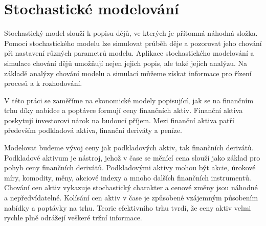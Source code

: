 \documentclass[a4paper,12pt]{report}
\theoremstyle{definition} \newtheorem{definice}[veta]{Definice}
\theoremstyle{remark}
\begin{document}

\chapter{Stochastické modelování}\label{stoch_model}

Stochastický model slouží k popisu dějů, ve kterých je přítomná náhodná složka.
Pomocí stochastického modelu lze simulovat průběh děje a pozorovat jeho chování při nastavení různých parametrů modelu.
Aplikace stochastického modelování a simulace chování dějů umožňují nejen jejich popis, ale také jejich analýzu.
Na základě analýzy chování modelu a simulací můžeme získat informace pro řízení procesů a k rozhodování.

V této práci se zaměříme na ekonomické modely popisující, jak se na finančním trhu díky nabídce a poptávce formují ceny finančních aktiv.
Finanční aktiva poskytují investorovi nárok na budoucí příjem.
Mezi finanční aktiva patří především podkladová aktiva, finanční deriváty a peníze.

Modelovat budeme vývoj ceny jak podkladových aktiv, tak finančních derivátů.
Podkladové aktivum je nástroj, jehož v čase se měnící cena slouží jako základ pro pohyb ceny finančních derivátů.
Podkladovými aktivy mohou být akcie, úrokové míry, komodity, měny, akciové indexy a mnoho dalších finančních instrumentů.
Chování cen aktiv vykazuje stochastický charakter a cenové změny jsou náhodné a nepředvídatelné.
Kolísání cen aktiv v čase je způsobené vzájemným působením nabídky a poptávky na trhu.
Teorie efektivního trhu tvrdí, že ceny aktiv velmi rychle plně odrážejí veškeré tržní informace.

\end{document}
